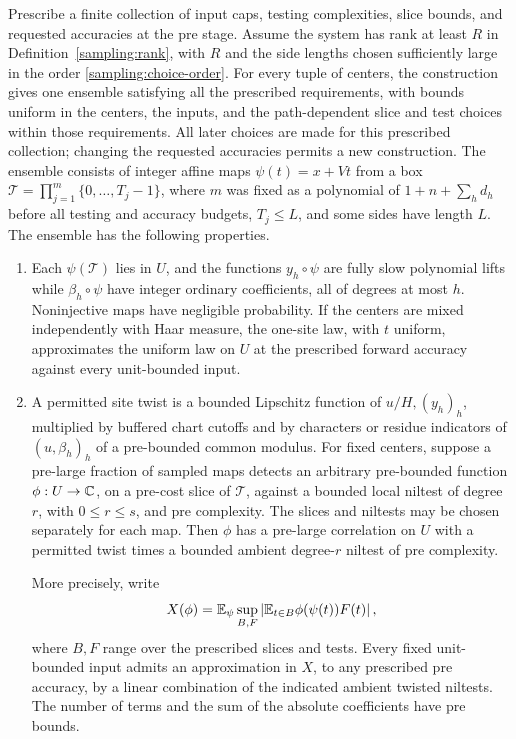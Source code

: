 \begin{proposition}
\label{sampling:constrained}
Prescribe a finite collection of input caps, testing complexities, slice
bounds, and requested accuracies at the pre stage.
Assume the system has rank at least $R$ in Definition~\ref{sampling:rank},
with $R$ and the side lengths chosen sufficiently large in the order
\eqref{sampling:choice-order}.  For every tuple of centers, the construction
gives one ensemble satisfying all the prescribed requirements, with bounds
uniform in the centers, the inputs, and the path-dependent slice and test
choices within those requirements.  All later choices are made for this
prescribed collection; changing the requested accuracies permits a new
construction.  The ensemble consists of integer
affine maps $\psi(t)=x+Vt$ from a box
$\mathcal T=\prod_{j=1}^m\{0,\ldots,T_j-1\}$, where $m$ was fixed as a polynomial of $1+n+\sum_hd_h$
before all testing and accuracy budgets, $T_j\le L$, and some sides have
length $L$.  The ensemble has the following properties.
\begin{enumerate}
\item\label{sampling:property-geometry}
Each $\psi(\mathcal T)$ lies in $U$, and the functions $y_h\circ\psi$
are fully slow polynomial lifts while $\beta_h\circ\psi$ have integer
ordinary coefficients, all of degrees at most $h$.  Noninjective maps have
negligible probability.  If the centers are mixed independently with Haar
measure, the one-site law, with $t$ uniform, approximates the uniform law on
$U$ at the prescribed forward accuracy against every unit-bounded input.

\item\label{sampling:property-detection}
A permitted site twist is a bounded Lipschitz function of
$u/H,(y_h)_h$, multiplied by buffered chart cutoffs and by characters or
residue indicators of $(u,\beta_h)_h$ of a pre-bounded common modulus.
For fixed centers, suppose a pre-large fraction of sampled maps detects an
arbitrary pre-bounded function $\phi:U\to\mathbb C$, on a pre-cost slice of
$\mathcal T$, against a bounded local niltest of degree $r$, with
$0\le r\le s$, and pre
complexity.  The slices and niltests may be chosen separately for each map.
Then $\phi$ has a pre-large correlation on $U$ with a permitted twist times
a bounded ambient degree-$r$ niltest of pre complexity.

More precisely, write
\[
 X(\phi)=\mathbb E_\psi\sup_{B,F}
 \left|\mathbb E_{t\in B}\phi(\psi(t))F(t)\right|,
\]
where $B,F$ range over the prescribed slices and tests.  Every fixed
unit-bounded input admits an approximation in $X$, to any prescribed
pre accuracy, by a linear combination of the indicated ambient twisted
niltests.  The number of terms and the sum of the absolute coefficients
have pre bounds.


\end{enumerate}
\end{proposition}
